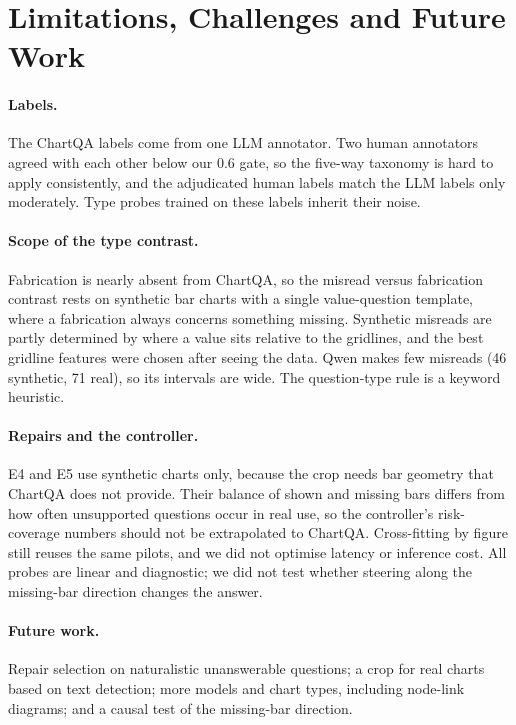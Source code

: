 \section*{Limitations, Challenges and Future Work}
\label{sec:limits}

\paragraph{Labels.} The ChartQA labels come from one LLM annotator. Two human
annotators agreed with each other below our 0.6 gate, so the five-way taxonomy is
hard to apply consistently, and the adjudicated human labels match the LLM labels
only moderately. Type probes trained on these labels inherit their noise.

\paragraph{Scope of the type contrast.} Fabrication is nearly absent from
ChartQA, so the misread versus fabrication contrast rests on synthetic bar charts
with a single value-question template, where a fabrication always concerns
something missing. Synthetic misreads are partly determined by where a value sits
relative to the gridlines, and the best gridline features were chosen after seeing the data. Qwen makes
few misreads (46 synthetic, 71 real), so its intervals are wide. The question-type
rule is a keyword heuristic.

\paragraph{Repairs and the controller.} E4 and E5 use synthetic charts only,
because the crop needs bar geometry that ChartQA does not provide. Their balance
of shown and missing bars differs from how often unsupported questions occur in
real use, so the controller's risk-coverage numbers should not be extrapolated to
ChartQA. Cross-fitting by figure still reuses the same pilots, and we did not
optimise latency or inference cost. All probes are linear and diagnostic; we did
not test whether steering along the missing-bar direction changes the answer.

\paragraph{Future work.} Repair selection on naturalistic unanswerable
questions; a crop for real charts based on text detection; more models and chart
types, including node-link diagrams; and a causal test of the missing-bar
direction.

